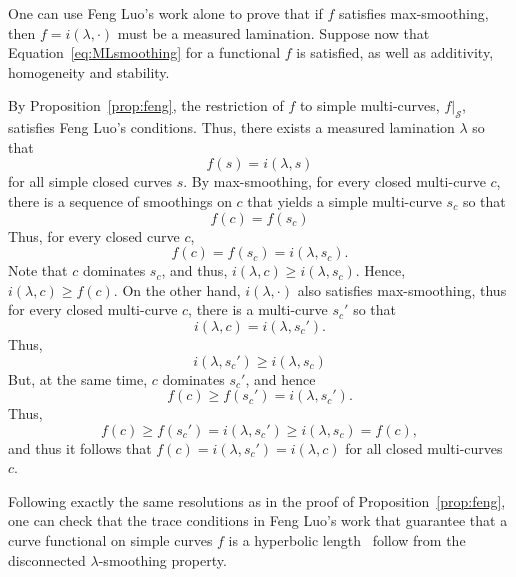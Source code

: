 \begin{remark}
One can use Feng Luo's work alone to prove that if $f$ satisfies max-smoothing, then $f=i(\lambda,\cdot)$ must be a measured lamination.
Suppose now that Equation~\ref{eq:MLsmoothing} for a functional $f$ is satisfied, as well as additivity, homogeneity and stability. 

By Proposition~\ref{prop:feng}, the restriction of $f$ to simple multi-curves, $f|_{\mathcal{S}}$, satisfies Feng Luo's conditions.
Thus, there exists a measured lamination $\lambda$ so that
\[
f(s)=i(\lambda, s)
\]
for all simple closed curves $s$.
By max-smoothing, for every closed multi-curve $c$, there is a sequence of smoothings on $c$ that yields a simple multi-curve $s_c$ so that
\[
f(c)=f(s_c)
\]
Thus, for every closed curve $c$,
\[
f(c)=f(s_c)=i(\lambda,s_c).
\]
Note that $c$ dominates $s_c$, and thus,
$i(\lambda,c) \geq i(\lambda,s_c)$.
Hence, $i(\lambda,c) \geq f(c)$.
On the other hand, $i(\lambda,\cdot)$ also satisfies max-smoothing, thus for every closed multi-curve $c$, there is a multi-curve $s_c'$ so that
\[
i(\lambda,c)=i(\lambda,s_c').
\]
Thus,
\[
i(\lambda,s_c') \geq i(\lambda,s_c)
\]
But, at the same time, $c$ dominates $s_c'$, and hence
\[
f(c) \geq f(s_c')=i(\lambda,s_c').
\]
Thus,
\[
f(c) \geq f(s_c')=i(\lambda,s_c') \geq i(\lambda, s_c)=f(c),
\]
and thus it follows that $f(c)=i(\lambda,s_c')=i(\lambda,c)$
for all closed multi-curves $c$.
\end{remark}

\begin{remark}
Following exactly the same resolutions as in the proof of Proposition~\ref{prop:feng}, one can check that the trace conditions in Feng Luo's work that guarantee that a curve functional on simple curves $f$ is a hyperbolic length~\cite{Luo98:GeodesicLength} follow from the disconnected $\lambda$-smoothing property.
\end{remark}